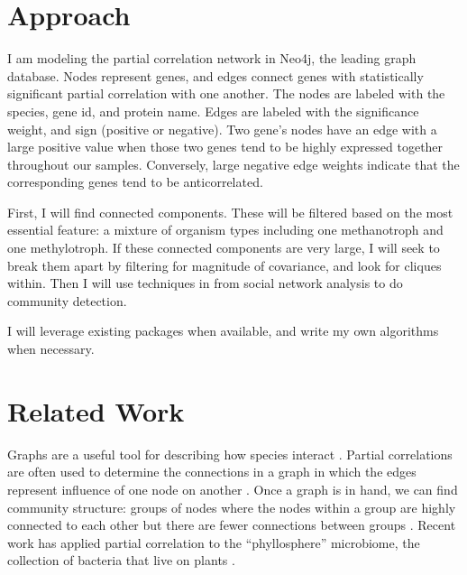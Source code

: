 \documentclass[12pt]{article}
\begin{document}
\section{Approach} %

I am modeling the partial correlation network in Neo4j, the leading graph database.
Nodes represent genes, and edges connect genes with statistically significant partial correlation with one another. 
The nodes are labeled with the species, gene id, and protein name.
Edges are labeled with the significance weight, and sign (positive or negative). 
Two gene's nodes have an edge with a large positive value when those two genes tend to be highly expressed together throughout our samples. 
Conversely, large negative edge weights indicate that the corresponding genes tend to be anticorrelated. 

First, I will find connected components.  %
These will be filtered based on the most essential feature: a mixture of organism types including one methanotroph and one methylotroph.
If these connected components are very large, I will seek to break them apart by filtering for magnitude of covariance, and look for cliques within. 
Then I will use techniques in from social network analysis to do community detection. 

I will leverage existing packages when available, and write my own algorithms when necessary. 

\section{Related Work}

Graphs are a useful tool for describing how species interact \cite{borthagaray2014inferring}.
Partial correlations are often used to determine the connections in a graph in which the edges represent influence of one node on another \cite{hero2012hub}. 
Once a graph is in hand, we can find community structure: groups of nodes where the nodes within a group are highly connected to each other but there are fewer connections between groups \cite{girvan2002community}.
Recent work has applied partial correlation to the ``phyllosphere'' microbiome, the collection of bacteria that live on plants \cite{agler2016microbial}.
\end{document}
